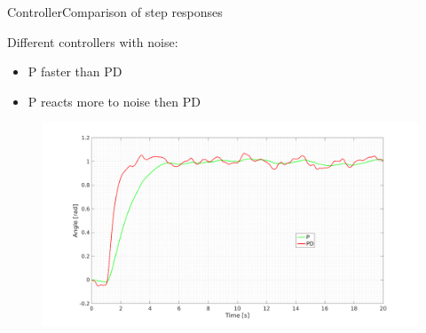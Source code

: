 \begin{frame}{Controller}{Comparison of step responses}
  \begin{block}{Different controllers with noise:}

	  \begin{itemize}
	  	\item P faster than PD
	  	\item P reacts more to noise then PD
	  \end{itemize}

	  \begin{figure}
        \includegraphics[scale=0.18]{../report/figures/PD_noise.png}
      \end{figure}
  
  \end{block}
\end{frame}

